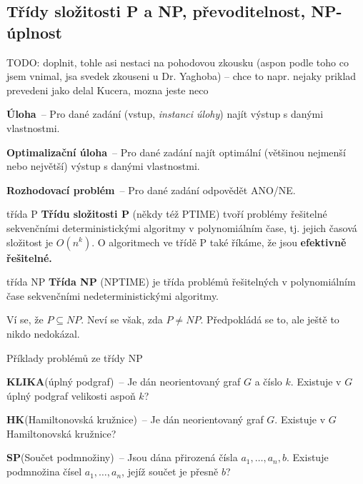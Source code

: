 \subsection{Třídy složitosti P a NP, převoditelnost, NP-úplnost}

TODO: doplnit, tohle asi nestaci na pohodovou zkousku (aspon podle toho co jsem vnimal, jsa svedek zkouseni u Dr. Yaghoba) -- chce to napr. nejaky priklad prevedeni jako delal Kucera, mozna jeste neco

\begin{definice}
  \begin{pitemize}
  \item \textbf{Úloha}~-- Pro dané zadání (vstup, \emph{instanci úlohy}) najít výstup s danými vlastnostmi.
  \item \textbf{Optimalizační úloha}~-- Pro dané zadání najít optimální (většinou
  nejmenší nebo největší) výstup s danými vlastnostmi.
  \item \textbf{Rozhodovací problém}~-- Pro dané zadání odpovědět ANO/NE.
  \end{pitemize}
\end{definice}

\begin{definiceN}{třída P}
 \textbf{Třídu složitosti P} (někdy též PTIME) tvoří problémy řešitelné
 sekvenčními deterministickými algoritmy v polynomiálním čase, tj. jejich časová
 složitost je $O(n^k)$. O algoritmech ve třídě P také říkáme, že jsou
 \textbf{efektivně řešitelné.}
\end{definiceN}

\begin{definiceN}{třída NP}
 \textbf{Třída NP} (NPTIME) je třída problémů řešitelných v polynomiálním čase
 sekvenčními nedeterministickými algoritmy. 
\end{definiceN}

\begin{poznamka}
  Ví se, že $P \subseteq NP$. Neví se však, zda $P \neq NP$. Předpokládá se to,
  ale ještě to nikdo nedokázal.
\end{poznamka}

\begin{obecne}{Příklady problémů ze třídy NP}
  \begin{pitemize}
    \item \textbf{KLIKA}(úplný podgraf)~-- Je dán neorientovaný graf $G$ a číslo
    $k$. Existuje v $G$ úplný podgraf velikosti aspoň $k$?
    \item \textbf{HK}(Hamiltonovská kružnice)~-- Je dán neorientovaný graf $G$.
    Existuje v $G$ Hamiltonovská kružnice?
    \item \textbf{SP}(Součet podmnožiny)~-- Jsou dána přirozená čísla $a_1,
    \dots, a_n,b$. Existuje podmnožina čísel $a_1,\dots,a_n$, jejíž součet je
    přesně $b$?
  \end{pitemize}
\end{obecne}

